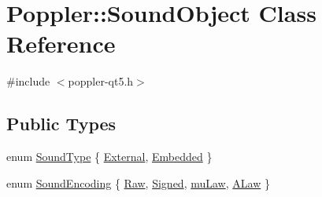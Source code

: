 \hypertarget{class_poppler_1_1_sound_object}{}\section{Poppler\+:\+:Sound\+Object Class Reference}
\label{class_poppler_1_1_sound_object}


{\ttfamily \#include $<$poppler-\/qt5.\+h$>$}

\subsection*{Public Types}
\begin{DoxyCompactItemize}
\item 
enum \hyperlink{class_poppler_1_1_sound_object_ac9f524c6c40abcbb1c9e09c29e020c5b}{Sound\+Type} \{ \hyperlink{class_poppler_1_1_sound_object_ac9f524c6c40abcbb1c9e09c29e020c5ba7336d237089fc02d79d722881b837530}{External}, 
\hyperlink{class_poppler_1_1_sound_object_ac9f524c6c40abcbb1c9e09c29e020c5bab50528f996b2b62c454d83c472ef27c8}{Embedded}
 \}
\item 
enum \hyperlink{class_poppler_1_1_sound_object_ac59f867ef18ebd7f3a85dec136f04640}{Sound\+Encoding} \{ \hyperlink{class_poppler_1_1_sound_object_ac59f867ef18ebd7f3a85dec136f04640acd5b3f64cc4684a7652abc9b7b5619e9}{Raw}, 
\hyperlink{class_poppler_1_1_sound_object_ac59f867ef18ebd7f3a85dec136f04640ac79e626daeb40c09097ec9ff6da82218}{Signed}, 
\hyperlink{class_poppler_1_1_sound_object_ac59f867ef18ebd7f3a85dec136f04640a53ccf694f74dbcddfaf3238e502a0511}{mu\+Law}, 
\hyperlink{class_poppler_1_1_sound_object_ac59f867ef18ebd7f3a85dec136f04640a072c6c63ffc967b19d527efb54e5ea64}{A\+Law}
 \}
\end{DoxyCompactItemize}
